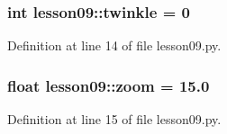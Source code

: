 \subsubsection{\setlength{\rightskip}{0pt plus 5cm}int {\bf lesson09::twinkle} = 0\hspace{0.3cm}{\tt  [static]}}\label{namespacelesson09_0dfc0229a02b354c72099db1c40d4734}




Definition at line 14 of file lesson09.py.
\subsubsection{\setlength{\rightskip}{0pt plus 5cm}float {\bf lesson09::zoom} = 15.0\hspace{0.3cm}{\tt  [static]}}\label{namespacelesson09_a9eac29a2556add0bd14f5318b21a329}




Definition at line 15 of file lesson09.py.